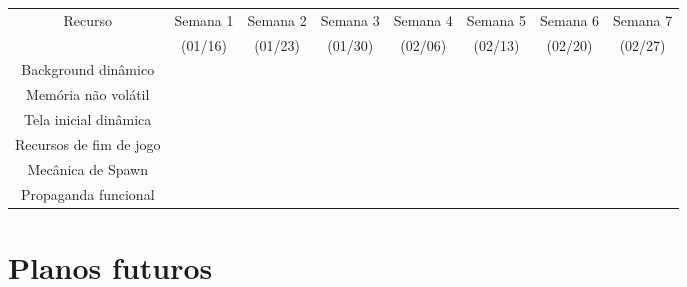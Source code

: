 \begin{adjustbox}{width = \textwidth, caption = {Planejamento escalonado}, nofloat=table, center, angle=90}
        \begin{tabular}{|cccccccc|}
            \cline{1-8}
            \multicolumn{1}{|c|}{Recurso} & \multicolumn{1}{c|}{Semana 1} & \multicolumn{1}{c|}{Semana 2} & \multicolumn{1}{c|}{Semana 3} & \multicolumn{1}{c|}{Semana 4} & \multicolumn{1}{c|}{Semana 5} & \multicolumn{1}{c|}{Semana 6} & Semana 7 \\
            \multicolumn{1}{|c|}{} & \multicolumn{1}{c|}{(01/16)} & \multicolumn{1}{c|}{(01/23)} & \multicolumn{1}{c|}{(01/30)} & \multicolumn{1}{c|}{(02/06)} & \multicolumn{1}{c|}{(02/13)} & \multicolumn{1}{c|}{(02/20)} & (02/27) \\ 
            \cline{1-8} 
            Background dinâmico & & & & & & & \\
            Memória não volátil & & & & & & & \\
            Tela inicial dinâmica & & & & & & & \\
            Recursos de fim de jogo & & & & & & & \\
            Mecânica de Spawn & & & & & & & \\
            Propaganda funcional & & & & & & & \\ \cline{1-8}
        \end{tabular}
\end{adjustbox}

    
\chapter{Planos futuros}



% 
% 




